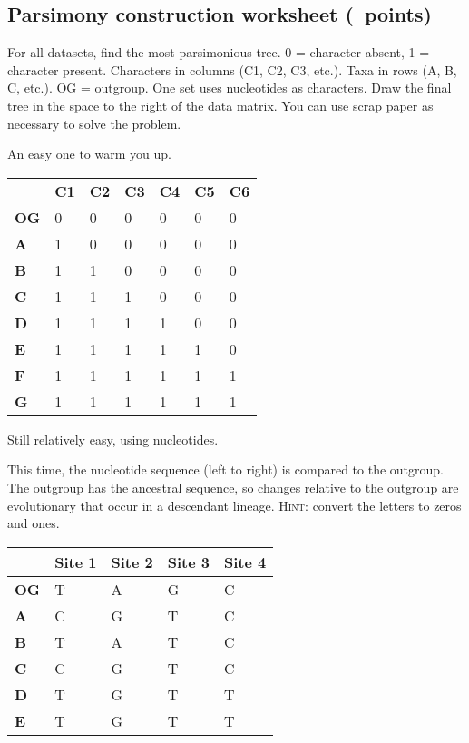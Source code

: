 \documentclass[11pt, addpoints, hidelinks]{exam}
\newcommand*\AnswerBox[2]{%
	\parbox[t][#1]{0.92\textwidth}{%
		\begin{solution}#2\end{solution}}
	\vspace{\stretch{1}}
}
\begin{document}
\subsection*{Parsimony construction worksheet (\numpoints~points)}

For all datasets, find the most parsimonious tree. 0 = character absent,
1 = character present. Characters in columns (C1, C2, C3, etc.). Taxa in
rows (A, B, C, etc.). OG = outgroup. One set uses nucleotides as
characters. Draw the final tree in the space to the right of the data
matrix. You can use scrap paper as necessary to solve the problem.

\begin{questions}
	

\question[3]
An easy one to warm you up.

\begin{longtable}[l]{@{}lllllll@{}}
\toprule
\endhead
& \textbf{C1} & \textbf{C2} & \textbf{C3} & \textbf{C4} & \textbf{C5} &
\textbf{C6}\tabularnewline
\textbf{OG} & 0 & 0 & 0 & 0 & 0 & 0\tabularnewline
\textbf{A} & 1 & 0 & 0 & 0 & 0 & 0\tabularnewline
\textbf{B} & 1 & 1 & 0 & 0 & 0 & 0\tabularnewline
\textbf{C} & 1 & 1 & 1 & 0 & 0 & 0\tabularnewline
\textbf{D} & 1 & 1 & 1 & 1 & 0 & 0\tabularnewline
\textbf{E} & 1 & 1 & 1 & 1 & 1 & 0\tabularnewline
\textbf{F} & 1 & 1 & 1 & 1 & 1 & 1\tabularnewline
\textbf{G} & 1 & 1 & 1 & 1 & 1 & 1\tabularnewline
\bottomrule
\end{longtable}

\AnswerBox{0.12\textheight}{}

\question[3]
Still relatively easy, using nucleotides.

This time, the
nucleotide sequence (left to right) is compared to the outgroup. The
outgroup has the ancestral sequence, so changes relative to the outgroup
are evolutionary that occur in a descendant lineage. \textsc{Hint:} convert
the letters to zeros and ones.

\begin{longtable}[l]{@{}lllll@{}}
\toprule
& \textbf{Site 1} & \textbf{Site 2} & \textbf{Site 3} & \textbf{Site
4}\tabularnewline
\midrule
\endhead
\textbf{OG} & T & A & G & C\tabularnewline
\textbf{A} & C & G & T & C\tabularnewline
\textbf{B} & T & A & T & C\tabularnewline
\textbf{C} & C & G & T & C\tabularnewline
\textbf{D} & T & G & T & T\tabularnewline
\textbf{E} & T & G & T & T\tabularnewline
\bottomrule
\end{longtable}

\AnswerBox{0.1\textheight}{}


\end{questions}
\end{document}
